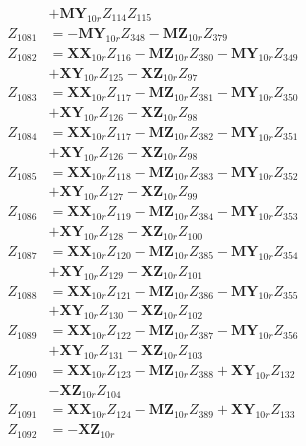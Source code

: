 \begin{multicols}{2}
\begin{align}
&+ \mathbf{MY}_{10r}Z_{114}Z_{115} \nonumber \\
Z_{1081} &= - \mathbf{MY}_{10r}Z_{348} - \mathbf{MZ}_{10r}Z_{379} \nonumber \\
Z_{1082} &= \mathbf{XX}_{10r}Z_{116} - \mathbf{MZ}_{10r}Z_{380} - \mathbf{MY}_{10r}Z_{349}  \nonumber \\
&+ \mathbf{XY}_{10r}Z_{125} - \mathbf{XZ}_{10r}Z_{97} \nonumber \\
Z_{1083} &= \mathbf{XX}_{10r}Z_{117} - \mathbf{MZ}_{10r}Z_{381} - \mathbf{MY}_{10r}Z_{350}  \nonumber \\
&+ \mathbf{XY}_{10r}Z_{126} - \mathbf{XZ}_{10r}Z_{98} \nonumber \\
Z_{1084} &= \mathbf{XX}_{10r}Z_{117} - \mathbf{MZ}_{10r}Z_{382} - \mathbf{MY}_{10r}Z_{351}  \nonumber \\
&+ \mathbf{XY}_{10r}Z_{126} - \mathbf{XZ}_{10r}Z_{98} \nonumber \\
Z_{1085} &= \mathbf{XX}_{10r}Z_{118} - \mathbf{MZ}_{10r}Z_{383} - \mathbf{MY}_{10r}Z_{352}  \nonumber \\
&+ \mathbf{XY}_{10r}Z_{127} - \mathbf{XZ}_{10r}Z_{99} \nonumber \\
Z_{1086} &= \mathbf{XX}_{10r}Z_{119} - \mathbf{MZ}_{10r}Z_{384} - \mathbf{MY}_{10r}Z_{353}  \nonumber \\
&+ \mathbf{XY}_{10r}Z_{128} - \mathbf{XZ}_{10r}Z_{100} \nonumber \\
Z_{1087} &= \mathbf{XX}_{10r}Z_{120} - \mathbf{MZ}_{10r}Z_{385} - \mathbf{MY}_{10r}Z_{354}  \nonumber \\
&+ \mathbf{XY}_{10r}Z_{129} - \mathbf{XZ}_{10r}Z_{101} \nonumber \\
Z_{1088} &= \mathbf{XX}_{10r}Z_{121} - \mathbf{MZ}_{10r}Z_{386} - \mathbf{MY}_{10r}Z_{355}  \nonumber \\
&+ \mathbf{XY}_{10r}Z_{130} - \mathbf{XZ}_{10r}Z_{102} \nonumber \\
Z_{1089} &= \mathbf{XX}_{10r}Z_{122} - \mathbf{MZ}_{10r}Z_{387} - \mathbf{MY}_{10r}Z_{356}  \nonumber \\
&+ \mathbf{XY}_{10r}Z_{131} - \mathbf{XZ}_{10r}Z_{103} \nonumber \\
Z_{1090} &= \mathbf{XX}_{10r}Z_{123} - \mathbf{MZ}_{10r}Z_{388} + \mathbf{XY}_{10r}Z_{132}  \nonumber \\
&- \mathbf{XZ}_{10r}Z_{104} \nonumber \\
Z_{1091} &= \mathbf{XX}_{10r}Z_{124} - \mathbf{MZ}_{10r}Z_{389} + \mathbf{XY}_{10r}Z_{133} \nonumber \\
Z_{1092} &= -\mathbf{XZ}_{10r} \nonumber \\

\end{align}
\end{multicols}
